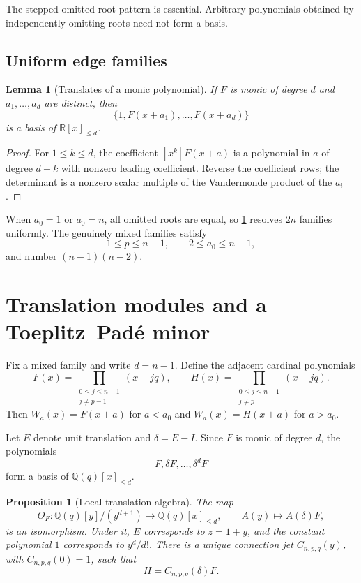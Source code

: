 \documentclass[11pt]{amsart}
\newcommand{\R}{\mathbb R}
\newcommand{\Q}{\mathbb Q}
\newcommand{\1}{\mathbf 1}
\newtheorem{proposition}[theorem]{Proposition}
\newtheorem{lemma}[theorem]{Lemma}
\theoremstyle{remark}
\begin{document}
The stepped omitted-root pattern is essential. Arbitrary polynomials obtained by independently omitting roots need not form a basis.

\subsection{Uniform edge families}
\begin{lemma}[Translates of a monic polynomial]\label{lem:translates-main}
If $F$ is monic of degree $d$ and $a_1,\ldots,a_d$ are distinct, then
\[
 \{1,F(x+a_1),\ldots,F(x+a_d)\}
\]
is a basis of $\R[x]_{\le d}$.
\end{lemma}

\begin{proof}
For $1\le k\le d$, the coefficient $[x^k]F(x+a)$ is a polynomial in $a$ of degree $d-k$ with nonzero leading coefficient. Reverse the coefficient rows; the determinant is a nonzero scalar multiple of the Vandermonde product of the $a_i$.
\end{proof}

When $a_0=1$ or $a_0=n$, all omitted roots are equal, so \cref{lem:translates-main} resolves $2n$ families uniformly. The genuinely mixed families satisfy
\[
 1\le p\le n-1,\qquad2\le a_0\le n-1,
\]
and number $(n-1)(n-2)$.

\section{Translation modules and a Toeplitz--Pad\'e minor}
\label{sec:toeplitz}

Fix a mixed family and write $d=n-1$. Define the adjacent cardinal polynomials
\begin{equation}\label{eq:F-H-main}
 F(x)=\prod_{\substack{0\le j\le n-1\\j\ne p-1}}(x-jq),
 \qquad
 H(x)=\prod_{\substack{0\le j\le n-1\\j\ne p}}(x-jq).
\end{equation}
Then $W_a(x)=F(x+a)$ for $a<a_0$ and $W_a(x)=H(x+a)$ for $a>a_0$.

Let $E$ denote unit translation and $\delta=E-I$. Since $F$ is monic of degree $d$, the polynomials
\[
 F,\delta F,\ldots,\delta^dF
\]
form a basis of $\Q(q)[x]_{\le d}$.

\begin{proposition}[Local translation algebra]\label{prop:translation-main}
The map
\[
 \Theta_F:\Q(q)[y]/(y^{d+1})\longrightarrow\Q(q)[x]_{\le d},
 \qquad A(y)\longmapsto A(\delta)F,
\]
is an isomorphism. Under it, $E$ corresponds to $z=1+y$, and the constant polynomial $1$ corresponds to $y^d/d!$. There is a unique connection jet $C_{n,p,q}(y)$, with $C_{n,p,q}(0)=1$, such that
\[
 H=C_{n,p,q}(\delta)F.
\]
\end{proposition}
\end{document}
